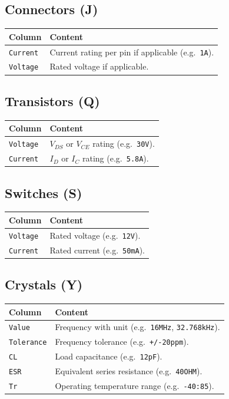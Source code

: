 \documentclass[11pt,a4paper]{article}
\begin{document}
\subsection{Connectors (J)}

\begin{tabular}{@{}lL{9cm}@{}}
\toprule
Column & Content \\
\midrule
\texttt{Current}   & Current rating per pin if applicable (e.g.\ \texttt{1A}). \\
\texttt{Voltage}   & Rated voltage if applicable. \\
\bottomrule
\end{tabular}

\subsection{Transistors (Q)}

\begin{tabular}{@{}lL{9cm}@{}}
\toprule
Column & Content \\
\midrule
\texttt{Voltage}   & $V_{DS}$ or $V_{CE}$ rating (e.g.\ \texttt{30V}). \\
\texttt{Current}   & $I_D$ or $I_C$ rating (e.g.\ \texttt{5.8A}). \\
\bottomrule
\end{tabular}

\subsection{Switches (S)}

\begin{tabular}{@{}lL{9cm}@{}}
\toprule
Column & Content \\
\midrule
\texttt{Voltage}   & Rated voltage (e.g.\ \texttt{12V}). \\
\texttt{Current}   & Rated current (e.g.\ \texttt{50mA}). \\
\bottomrule
\end{tabular}

\subsection{Crystals (Y)}

\begin{tabular}{@{}lL{9cm}@{}}
\toprule
Column & Content \\
\midrule
\texttt{Value}     & Frequency with unit (e.g.\ \texttt{16MHz}, \texttt{32.768kHz}). \\
\texttt{Tolerance} & Frequency tolerance (e.g.\ \texttt{+/-20ppm}). \\
\texttt{CL}        & Load capacitance (e.g.\ \texttt{12pF}). \\
\texttt{ESR}       & Equivalent series resistance (e.g.\ \texttt{40OHM}). \\
\texttt{Tr}        & Operating temperature range (e.g.\ \texttt{-40:85}). \\
\bottomrule
\end{tabular}
\end{document}
